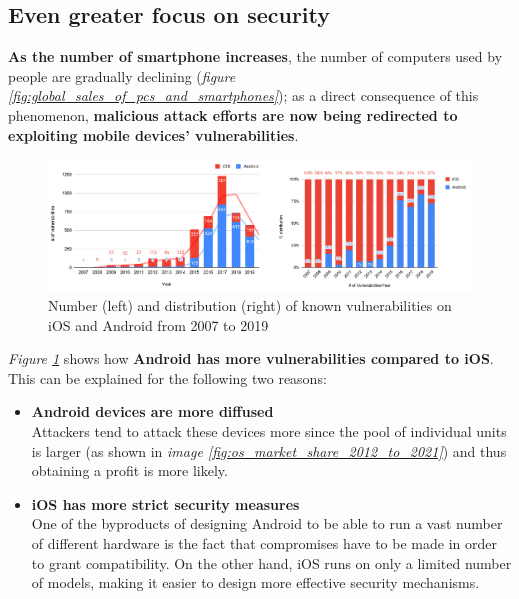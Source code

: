 \subsection{Even greater focus on security}
\textbf{As the number of smartphone increases}, the number of computers used by people are gradually declining (\textit{figure \ref{fig:global_sales_of_pcs_and_smartphones}}); as a direct consequence of this phenomenon, \textbf{malicious attack efforts are now being redirected to exploiting mobile devices' vulnerabilities}.
\begin{figure}[!ht]
    \centering
    \includegraphics[width=\linewidth]{document/chapters/chapter_3/images/mobile_vulnerabilities.jpg}
    \caption{Number (left) and distribution (right) of known vulnerabilities on iOS and Android from 2007 to 2019 \cite{mobile_security}}
    \label{fig:mobile_vulnerabilities}
\end{figure}
\textit{Figure \ref{fig:mobile_vulnerabilities}} shows how \textbf{Android has more vulnerabilities compared to iOS}. This can be explained for the following two reasons:
\begin{itemize}
    \item \textbf{Android devices are more diffused}\\
    Attackers tend to attack these devices more since the pool of individual units is larger (as shown in \textit{image \ref{fig:os_market_share_2012_to_2021}}) and thus obtaining a profit is more likely.
    \item \textbf{iOS has more strict security measures} \cite{mobile_security}\\
    One of the byproducts of designing Android to be able to run a vast number of different hardware is the fact that compromises have to be made in order to grant compatibility. On the other hand, iOS runs on only a limited number of models, making it easier to design more effective security mechanisms. 
\end{itemize}
